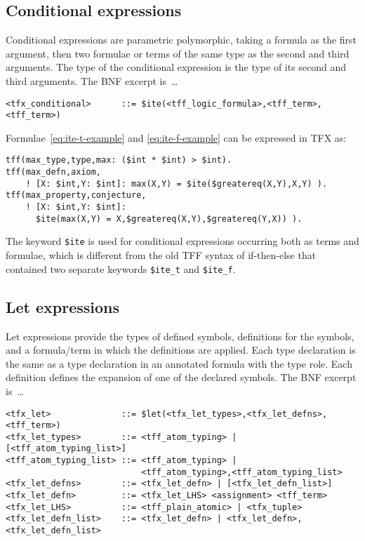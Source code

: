 \documentclass{easychair}
\begin{document}
\subsection{Conditional expressions}

Conditional expressions are parametric polymorphic, taking a formula as the 
first argument, then two formulae or terms of the same type as the second and 
third arguments. The type of the conditional expression is the type of its second and third arguments. The BNF excerpt is~\ldots
\begin{verbatim}
<tfx_conditional>      ::= $ite(<tff_logic_formula>,<tff_term>,<tff_term>)
\end{verbatim}

Formulae~\ref{eq:ite-t-example} and \ref{eq:ite-f-example} can be expressed in
TFX as:
\begin{verbatim}
tff(max_type,type,max: ($int * $int) > $int).
tff(max_defn,axiom,
    ! [X: $int,Y: $int]: max(X,Y) = $ite($greatereq(X,Y),X,Y) ).
tff(max_property,conjecture,
    ! [X: $int,Y: $int]: 
      $ite(max(X,Y) = X,$greatereq(X,Y),$greatereq(Y,X)) ).
\end{verbatim}

The keyword \verb'$ite' is used for conditional expressions occurring both as
terms and formulae, which is different from the old TFF syntax of if-then-else
that contained two separate keywords \verb'$ite_t' and \verb'$ite_f'.

\subsection{Let expressions}

Let expressions provide the types of defined symbols, definitions for the 
symbols, and a formula/term in which the definitions are applied. 
Each type declaration is the same as a type declaration in an annotated 
formula with the type role.
Each definition defines the expansion of one of the declared symbols.
The BNF excerpt is~\ldots
\begin{verbatim}
<tfx_let>              ::= $let(<tfx_let_types>,<tfx_let_defns>,<tff_term>)
<tfx_let_types>        ::= <tff_atom_typing> | [<tff_atom_typing_list>]
<tff_atom_typing_list> ::= <tff_atom_typing> |
                           <tff_atom_typing>,<tff_atom_typing_list>
<tfx_let_defns>        ::= <tfx_let_defn> | [<tfx_let_defn_list>]
<tfx_let_defn>         ::= <tfx_let_LHS> <assignment> <tff_term>
<tfx_let_LHS>          ::= <tff_plain_atomic> | <tfx_tuple>
<tfx_let_defn_list>    ::= <tfx_let_defn> | <tfx_let_defn>,<tfx_let_defn_list>
\end{verbatim}
\end{document}
